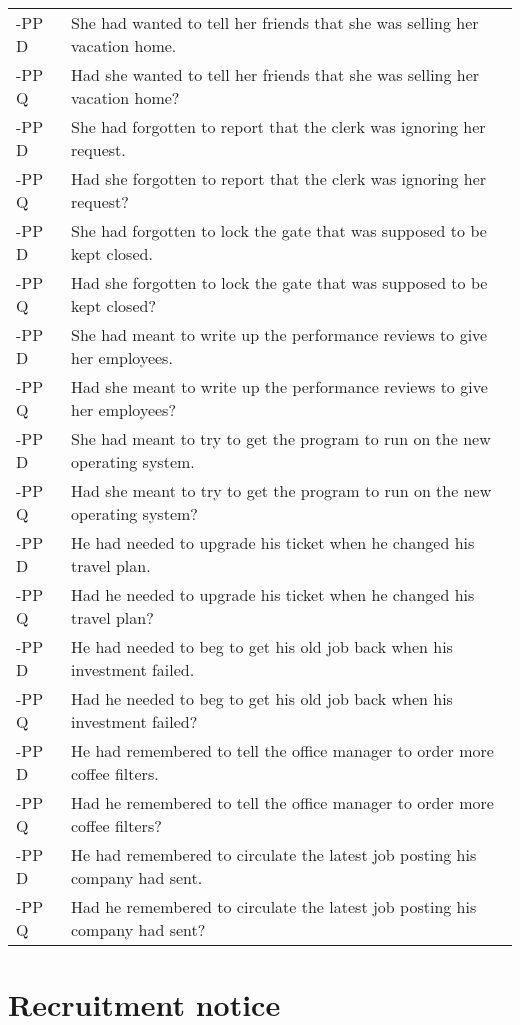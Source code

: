 \documentclass[11pt,oneside]{book}
\begin{document}
\begin{longtable}{ll}
\addlinespace
-PP D & She had wanted to tell her friends that she was selling her vacation home.\\
-PP Q & Had she wanted to tell her friends that she was selling her vacation home?\\
\addlinespace
-PP D & She had forgotten to report that the clerk was ignoring her request.\\
-PP Q & Had she forgotten to report that the clerk was ignoring her request?\\
\addlinespace
-PP D & She had forgotten to lock the gate that was supposed to be kept closed.\\
-PP Q & Had she forgotten to lock the gate that was supposed to be kept closed?\\
\addlinespace
-PP D & She had meant to write up the performance reviews to give her employees.\\
-PP Q & Had she meant to write up the performance reviews to give her employees?\\
\addlinespace
-PP D & She had meant to try to get the program to run on the new operating system.\\
-PP Q & Had she meant to try to get the program to run on the new operating system?\\
\addlinespace
-PP D & He had needed to upgrade his ticket when he changed his travel plan.\\
-PP Q & Had he needed to upgrade his ticket when he changed his travel plan?\\
\addlinespace
-PP D & He had needed to beg to get his old job back when his investment failed.\\
-PP Q & Had he needed to beg to get his old job back when his investment failed?\\
\addlinespace
-PP D & He had remembered to tell the office manager to order more coffee filters.\\
-PP Q & Had he remembered to tell the office manager to order more coffee filters?\\
\addlinespace
-PP D & He had remembered to circulate the latest job posting his company had sent.\\
-PP Q & Had he remembered to circulate the latest job posting his company had sent?\\*
\end{longtable}

\newpage

\hypertarget{rec}{%
\chapter{Recruitment notice}\label{rec}}
\end{document}
